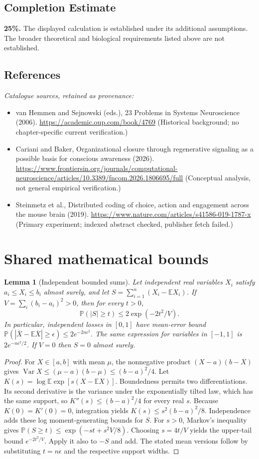 \documentclass[11pt]{article}
\newcommand{\E}{\mathbb E}
\newcommand{\Prob}{\mathbb P}
\DeclareMathOperator{\Var}{Var}
\providecommand{\E}{\mathbb E}
\providecommand{\Prob}{\mathbb P}
\providecommand{\Var}{\operatorname{Var}}
\newtheorem{sharedlemma}{Lemma}[section]
\begin{document}
\subsection{Completion Estimate}
\textbf{25\%.} The displayed calculation is established under its additional assumptions. The broader theoretical and biological requirements listed above are not established.
\subsection{References}
\noindent\emph{Catalogue sources, retained as provenance:}
\begin{itemize}
\item van Hemmen and Sejnowski (eds.), 23 Problems in Systems Neuroscience (2006). \url{https://academic.oup.com/book/4769} (Historical background; no chapter-specific current verification.)
\item Cariani and Baker, Organizational closure through regenerative signaling as a possible basis for conscious awareness (2026). \url{https://www.frontiersin.org/journals/computational-neuroscience/articles/10.3389/fncom.2026.1806695/full} (Conceptual analysis, not general empirical verification.)
\item Steinmetz et al., Distributed coding of choice, action and engagement across the mouse brain (2019). \url{https://www.nature.com/articles/s41586-019-1787-x} (Primary experiment; indexed abstract checked, publisher fetch failed.)
\end{itemize}
\clearpage


\appendix
\section{Shared mathematical bounds}\label{app:bounds}
\begin{sharedlemma}[Independent bounded sums]\label{lem:bounded}
Let independent real variables $X_i$ satisfy $a_i\leq X_i\leq b_i$ almost surely,
and let $S=\sum_{i=1}^n(X_i-\E X_i)$. If
$V=\sum_i(b_i-a_i)^2>0$, then for every $t>0$,
\[
 \Prob(|S|\geq t)\leq 2\exp(-2t^2/V).
\]
In particular, independent losses in $[0,1]$ have mean-error bound
$\Prob(|\overline X-\E\overline X|\geq\epsilon)
\leq2e^{-2n\epsilon^2}$. The same expression for variables in $[-1,1]$
is $2e^{-n\epsilon^2/2}$. If $V=0$ then $S=0$ almost surely.
\end{sharedlemma}
\begin{proof}
For $X\in[a,b]$ with mean $\mu$, the nonnegative product
$(X-a)(b-X)$ gives
$\Var X\leq(\mu-a)(b-\mu)\leq(b-a)^2/4$.
Let $K(s)=\log\E\exp[s(X-\E X)]$.
Boundedness permits two differentiations. Its second derivative is the variance
under the exponentially tilted law, which has the same support, so
$K''(s)\leq(b-a)^2/4$ for every real $s$.
Because $K(0)=K'(0)=0$, integration yields
$K(s)\leq s^2(b-a)^2/8$.
Independence adds these log moment-generating bounds for $S$.
For $s>0$, Markov's inequality gives
$\Prob(S\geq t)\leq\exp(-st+s^2V/8)$.
Choosing $s=4t/V$ yields the upper-tail bound $e^{-2t^2/V}$.
Apply it also to $-S$ and add. The stated mean versions follow by substituting
$t=n\epsilon$ and the respective support widths.
\end{proof}
\end{document}
